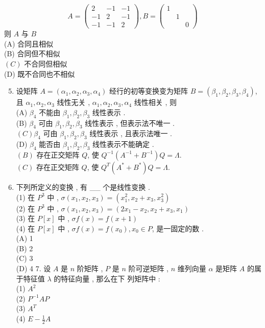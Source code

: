 \documentclass[10pt]{article}
\begin{document}
{\begin{enumerate}
\end{enumerate}
$$
A=\left(\begin{array}{ccc}
2 & -1 & -1 \\
-1 & 2 & -1 \\
-1 & -1 & 2
\end{array}\right), B=\left(\begin{array}{ccc}
1 & & \\
& 1 & \\
& & 0
\end{array}\right)
$$
 则  $A$  与  $B$\\
(A)  合同且相似 \\
(B)  合同但不相似 \\
$(C)$  不合同但相似 \\
(D)  既不合同也不相似 

\begin{enumerate}
  \setcounter{enumi}{4}
  \item  设矩阵  $A=\left(\alpha_{1}, \alpha_{2}, \alpha_{3}, \alpha_{4}\right)$  经行的初等变换变为矩阵  $B=\left(\beta_{1}, \beta_{2}, \beta_{3}, \beta_{4}\right)$,  且  $\alpha_{1}, \alpha_{2}, \alpha_{3}$  线性无关 , $\alpha_{1}, \alpha_{2}, \alpha_{3}, \alpha_{4}$  线性相关 ,  则 \\
(A) $\beta_{4}$  不能由  $\beta_{1}, \beta_{2}, \beta_{3}$  线性表示 .\\
(B) $\beta_{4}$  可由  $\beta_{1}, \beta_{2}, \beta_{3}$  线性表示 ,  但表示法不唯一 .\\
$(C) \beta_{4}$  可由  $\beta_{1}, \beta_{2}, \beta_{3}$  线性表示 ,  且表示法唯一 .\\
(D) $\beta_{4}$  能否由  $\beta_{1}, \beta_{2}, \beta_{3}$  线性表示不能确定 .\\
$(B)$  存在正交矩阵  $Q$,  使  $Q^{-1}\left(A^{-1}+B^{-1}\right) Q=\Lambda$.\\
$(C)$  存在正交矩阵  $Q$,  使  $Q^{T}\left(A^{*}+B^{*}\right) Q=\Lambda$.

  \item  下列所定义的变换 ,  有  \_\_  个是线性变换 .\\
(1)  在  $P^{3}$  中 , $\sigma\left(x_{1}, x_{2}, x_{3}\right)=\left(x_{1}^{2}, x_{2}+x_{3}, x_{3}^{2}\right)$\\
(2)  在  $P^{3}$  中 , $\sigma\left(x_{1}, x_{2}, x_{3}\right)=\left(2 x_{1}-x_{2}, x_{2}+x_{3}, x_{1}\right)$\\
(3)  在  $P[x]$  中 , $\sigma f(x)=f(x+1)$\\
(4)  在  $P[x]$  中 , $\sigma f(x)=f\left(x_{0}\right), x_{0} \in P$,  是一固定的数 .\\
(A) 1\\
(B) 2\\
(C) 3\\
(D) 4 7.  设  $A$  是  $n$  阶矩阵 , $P$  是  $n$  阶可逆矩阵 , $n$  维列向量  $\alpha$  是矩阵  $A$  的属于特征值  $\lambda$  的特征向量 ,  那么在下   列矩阵中 :\\
(1) $A^{2}$\\
(2) $P^{-1} A P$\\
(3) $A^{T}$\\
(4) $E-\frac{1}{2} A$


\end{enumerate}}
\end{document}
